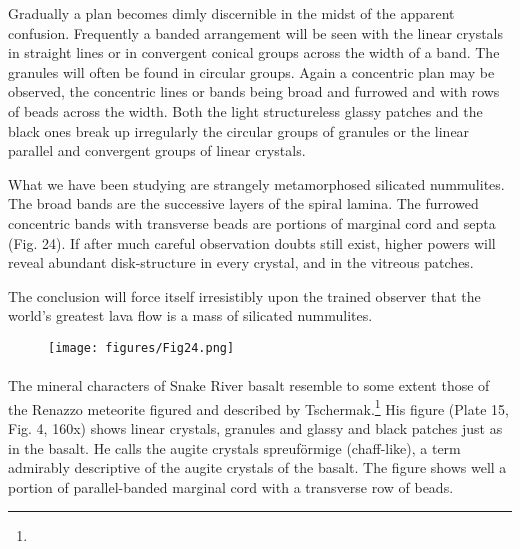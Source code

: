 \documentclass[a4paper, 12pt, oneside]{article}
\begin{document}
Gradually a plan becomes dimly discernible in the midst of the apparent confusion. Frequently a banded arrangement will be seen with the linear crystals in straight lines or in convergent conical groups across the width of a band. The granules will often be found in circular groups. Again a concentric plan may be observed, the concentric lines or bands being broad and furrowed and with rows of beads across the width. Both the light structureless glassy patches and the black ones break up irregularly the circular groups of granules or the linear parallel and convergent groups of linear crystals.

What we have been studying are strangely metamorphosed silicated nummulites. The broad bands are the successive layers of the spiral lamina. The furrowed concentric bands with transverse beads are portions of marginal cord and septa (Fig. 24). If after much careful observation doubts still exist, higher powers will reveal abundant disk-structure in every crystal, and in the vitreous patches.

The conclusion will force itself irresistibly upon the trained observer that the world's greatest lava flow is a mass of silicated nummulites.
\begin{figure}[H]
\centering
\texttt{[image: figures/Fig24.png]}
\caption*{}
\end{figure}
\paragraph{}
The mineral characters of Snake River basalt resemble to some extent those of the Renazzo meteorite figured and described by Tschermak.\footnote{} His figure (Plate 15, Fig. 4, 160x) shows linear crystals, granules and glassy and black patches just as in the basalt. He calls the augite crystals spreuförmige (chaff-like), a term admirably descriptive of the augite crystals of the basalt. The figure shows well a portion of parallel-banded marginal cord with a transverse row of beads.
\end{document}
